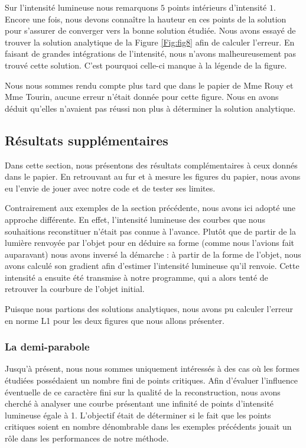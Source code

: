 Sur l'intensité lumineuse nous remarquons $5$ points intérieurs d'intensité $1$. Encore une fois, nous devons connaître la hauteur en ces points de la solution pour s'assurer de converger vers la bonne solution étudiée. Nous avons essayé de trouver la solution analytique de la Figure \ref{Fig:fig8} afin de calculer l'erreur. En faisant de grandes intégrations de l'intensité, nous n'avons malheureusement pas trouvé cette solution. C'est pourquoi celle-ci manque à la légende de la  figure. 

\begin{noremark}
    Nous nous sommes rendu compte plus tard que dans le papier de Mme Rouy et Mme Tourin, aucune erreur n'était donnée pour cette figure. Nous en avons déduit qu'elles n'avaient pas réussi non plus à déterminer la solution analytique.
\end{noremark}

\subsection{Résultats supplémentaires}
Dans cette section, nous présentons des résultats complémentaires à ceux donnés dans le papier. En retrouvant au fur et à mesure les figures du papier, nous avons eu l'envie de jouer avec notre code et de tester ses limites. 

Contrairement aux exemples de la section précédente, nous avons ici adopté une approche différente. En effet, l’intensité lumineuse des courbes que nous souhaitions reconstituer n’était pas connue à l’avance. Plutôt que de partir de la lumière renvoyée par l’objet pour en déduire sa forme (comme nous l’avions fait auparavant) nous avons inversé la démarche : à partir de la forme de l’objet, nous avons calculé son gradient afin d’estimer l’intensité lumineuse qu’il renvoie. Cette intensité a ensuite été transmise à notre programme, qui a alors tenté de retrouver la courbure de l’objet initial.

Puisque nous partions des solutions analytiques, nous avons pu calculer l'erreur en norme L1 pour les deux figures que nous allons présenter.


\subsubsection{La demi-parabole}
Jusqu’à présent, nous nous sommes uniquement intéressés à des cas où les formes étudiées possédaient un nombre fini de points critiques. Afin d’évaluer l’influence éventuelle de ce caractère fini sur la qualité de la reconstruction, nous avons cherché à analyser une courbe présentant une infinité de points d’intensité lumineuse égale à 1. L’objectif était de déterminer si le fait que les points critiques soient en nombre dénombrable dans les exemples précédents jouait un rôle dans les performances de notre méthode.

